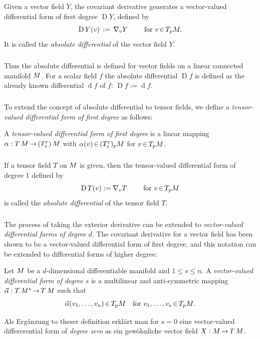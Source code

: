 \documentclass[11pt,twoside]{article}
\begin{document}
\subparagraph{}
Given a vector field $Y$,
the covariant derivative generates a vector-valued differential form
of first degree $\operatorname{D}Y$,
defined by
\[
\operatorname{D}Y(v) \,:=\, \nabla_v Y \qquad \mbox{ for } v {\,\in\,} T_p {M}.
\]
It is called the \textit{absolute differential} of the vector field $Y$.

\subparagraph{}
Thus the absolute differential is defined for vector fields on a
linear connected manifold ${M}$.
For a scalar field $f$ the absolute differential
$\operatorname{D}f$ is defined as the already known differential
$\operatorname{d}f$ of $f$: $\operatorname{D}f := \operatorname{d}f$.

\subparagraph{}
To extend the concept of absolute differential to tensor fields,
we define a \textit{tensor-valued differential form of first degree}
as follows:

\begin{definition}
A \textit{tensor-valued differential form of first degree} is a linear
mapping
$\alpha: T\,{M} {\,\to\,} (T^r_s)\,{M}$ with $\alpha(v) {\,\in\,} (T^r_s)_p {M}$
for $v {\,\in\,} T_p {M}$.
\end{definition}

\subparagraph{}
If a tensor field $T$ on ${M}$ is given,
then the tensor-valued differential form of degree $1$ defined by
\[
\operatorname{D}T(v) := \nabla_v T \qquad \mbox{ for } v {\,\in\,} T_p {M}
\]
is called the \textit{absolute differential} of the tensor field $T$.

\subparagraph{}
The process of taking the exterior derivative can be extended to
\textit{vector-valued differential forms of degree $d$}.
The covariant derivative for a vector field has been shown to be
a vector-valued differential form of first degree,
and this notation can be extended to differential forms of higher degree:

\begin{definition}
Let ${M}$ be a $d$-dimensional differentiable manifold
and $1 \leq s \leq n$.
A \textit{vector-valued differential form of degree $s$} is a
multilinear and anti-symmetric mapping
$\vec{\alpha}: T\,{M}^s {\,\to\,} T\,{M}$ such that
\[
\vec{\alpha}(v_1,\ldots,v_n) {\,\in\,} T_p {M} \quad
\mbox{for } v_1,\ldots,v_s {\,\in\,} T_p {M}.
\]
\end{definition}

\begin{remark}
Als Erg\"anzung to theser definition erkl\"art man for $s=0$ eine
vector-valued differerential form of \textit{degree zero} as ein
gew\"ohnliche vector field $X:{M} {\,\to\,} T\,{M}$.
\end{remark}
\end{document}
